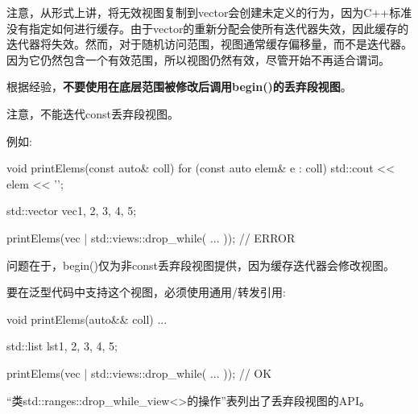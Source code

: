 注意，从形式上讲，将无效视图复制到vector会创建未定义的行为，因为C++标准没有指定如何进行缓存。由于vector的重新分配会使所有迭代器失效，因此缓存的迭代器将失效。然而，对于随机访问范围，视图通常缓存偏移量，而不是迭代器。因为它仍然包含一个有效范围，所以视图仍然有效，尽管开始不再适合谓词。

根据经验，\textbf{不要使用在底层范围被修改后调用begin()的丢弃段视图}。


注意，不能迭代const丢弃段视图。

例如:

\begin{cpp}
void printElems(const auto& coll) {
	for (const auto elem& e : coll) {
		std::cout << elem << '\n';
	}
}

std::vector vec{1, 2, 3, 4, 5};

printElems(vec | std::views::drop_while( ... )); // ERROR
\end{cpp}

问题在于，begin()仅为非const丢弃段视图提供，因为缓存迭代器会修改视图。

要在泛型代码中支持这个视图，必须使用通用/转发引用:

\begin{cpp}
void printElems(auto&& coll) {
	...
}

std::list lst{1, 2, 3, 4, 5};

printElems(vec | std::views::drop_while( ... )); // OK
\end{cpp}


“类std::ranges::drop\_while\_view<>的操作”表列出了丢弃段视图的API。

